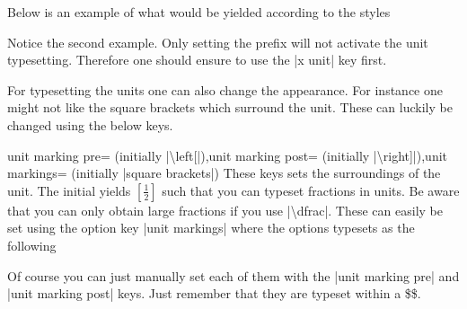 Below is an example of what would be yielded according to the styles
\begin{codeexample}
  \pgfplotsset{use units,x unit=T,xlabel=Temperature,ylabel=Nothing} 
  \pgfplotsset{use units,x unit prefix=m,xlabel=Temperature,ylabel=Nothing} 
\end{codeexample}
Notice the second example. Only setting the prefix will not activate the unit typesetting. Therefore one should ensure to use the |x unit| key first.

For typesetting the units one can also change the appearance. For instance one might not like the square brackets which surround the unit. These can
luckily be changed using the below keys.
\begin{pgfplotskeylist}{unit marking pre= (initially |\textbackslash left[|),unit marking post= (initially |\textbackslash right]|),unit markings= (initially |square brackets|)}
  These keys sets the surroundings of the unit. The initial yields $\left[\frac{1}{2}\right]$ such that you can typeset fractions in units. Be aware that
  you can only obtain large fractions if you use |\textbackslash dfrac|. These can easily be set using the option key |unit markings| where the options typesets as the following
\begin{codeexample}
  \pgfplotsset{x unit=T,unit markings=parenthesis} %
  \pgfplotsset{x unit=T,unit markings=square brackets} %
  \pgfplotsset{x unit=T,unit markings=slash space} %
\end{codeexample}
  Of course you can just manually set each of them with the |unit marking pre| and |unit marking post| keys. Just remember that they are typeset within a \$\$.
\end{pgfplotskeylist}

